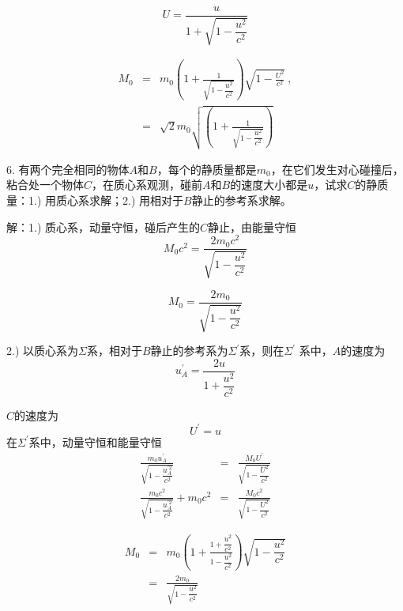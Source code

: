 \documentclass[11pt,a4paper]{article}
\begin{document}
\begin{equation*}
U = \frac{u}{1+\sqrt{1-\dfrac{u^2}{c^2} } }
\end{equation*}

\begin{eqnarray*}
M_0 &=& m_0 \left(1+\frac{1}{\sqrt{1-\dfrac{u^2}{c^2}} }  \right) \sqrt{1-\frac{U^2}{c^2}} ~,\\
&=& \sqrt{2} m_0  \sqrt{\left(1+\frac{1}{\sqrt{1-\dfrac{u^2}{c^2}} }  \right)}
\end{eqnarray*}

6. 有两个完全相同的物体$A$和$B$，每个的静质量都是$m_0$，在它们发生对心碰撞后，粘合处一个物体$C$，在质心系观测，碰前$A$和$B$的速度大小都是$u$，试求$C$的静质量：1.) 用质心系求解；2.) 用相对于$B$静止的参考系求解。

解：1.) 质心系，动量守恒，碰后产生的$C$静止，由能量守恒
\begin{equation*}
M_0 c^2 = \frac{2m_0 c^2}{\sqrt{1-\dfrac{u^2}{c^2}} }
\end{equation*}

\begin{equation*}
M_0 = \frac{2m_0}{\sqrt{1-\dfrac{u^2}{c^2}} }
\end{equation*}

2.) 以质心系为$\Sigma$系，相对于$B$静止的参考系为$\Sigma^{\prime}$系，则在$\Sigma^{\prime}$ 系中，$A$的速度为
\begin{equation*}
u_A^{\prime} = \frac{2u}{1+\dfrac{u^2}{c^2}}
\end{equation*}

$C$的速度为
\begin{equation*}
U^{\prime} = u
\end{equation*}
在$\Sigma^{\prime}$系中，动量守恒和能量守恒
\begin{eqnarray*}
\frac{m_0 u_A^{\prime } }{\sqrt{1-\dfrac{u_A^{\prime 2}}{c^2}} } &=& \frac{M_0 U^{\prime}}{\sqrt{1-\dfrac{U^2}{c^2}} }\\
\frac{m_0 c^2}{\sqrt{1-\dfrac{u_A^{\prime 2}}{c^2}} } +m_0 c^2 &=& \frac{M_0 c^2}{\sqrt{1-\dfrac{U^2}{c^2}} }
\end{eqnarray*}


\begin{eqnarray*}
M_0 &=& m_0 \left(1 + \frac{1+\dfrac{u^2}{c^2}}{1-\dfrac{u^2}{c^2}}  \right) \sqrt{1 -\dfrac{u^2}{c^2}} \\
&=& \frac{2 m_0 }{\sqrt{1-\dfrac{u^2}{c^2}}}
\end{eqnarray*}















\end{document}
